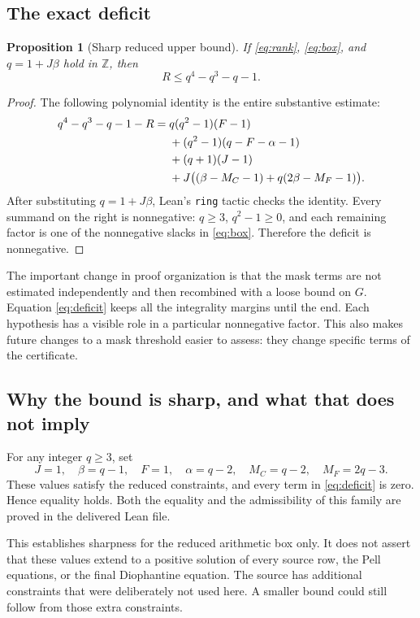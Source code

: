 \documentclass[11pt]{article}
\newtheorem{proposition}{Proposition}
\newcommand{\Z}{\mathbb Z}
\newcommand{\code}[1]{\nolinkurl{#1}}
\begin{document}
\subsection{The exact deficit}

\begin{proposition}[Sharp reduced upper bound]
If \eqref{eq:rank}, \eqref{eq:box}, and $q=1+J\beta$ hold in $\Z$, then
\[
 \boxed{R\le q^4-q^3-q-1.}
\]
\end{proposition}

\begin{proof}
The following polynomial identity is the entire substantive estimate:
\begin{align}
 q^4-q^3-q-1-R
 ={}&q(q^2-1)(F-1)\notag\\
 &+(q^2-1)(q-F-\alpha-1)\notag\\
 &+(q+1)(J-1)\label{eq:deficit}\\
 &+J\bigl((\beta-M_C-1)+q(2\beta-M_F-1)\bigr).\notag
\end{align}
After substituting $q=1+J\beta$, Lean's \code{ring} tactic checks the identity.
Every summand on the right is nonnegative: $q\ge3$, $q^2-1\ge0$, and each
remaining factor is one of the nonnegative slacks in \eqref{eq:box}. Therefore
the deficit is nonnegative.
\end{proof}

The important change in proof organization is that the mask terms are not
estimated independently and then recombined with a loose bound on $G$.
Equation \eqref{eq:deficit} keeps all the integrality margins until the end.
Each hypothesis has a visible role in a particular nonnegative factor. This
also makes future changes to a mask threshold easier to assess: they change
specific terms of the certificate.

\subsection{Why the bound is sharp, and what that does not imply}

For any integer $q\ge3$, set
\[
 J=1,\quad \beta=q-1,\quad F=1,\quad \alpha=q-2,\quad
 M_C=q-2,\quad M_F=2q-3.
\]
These values satisfy the reduced constraints, and every term in
\eqref{eq:deficit} is zero. Hence equality holds. Both the equality and the
admissibility of this family are proved in the delivered Lean file.

This establishes sharpness for the reduced arithmetic box only. It does not
assert that these values extend to a positive solution of every source row,
the Pell equations, or the final Diophantine equation. The source has additional
constraints that were deliberately not used here. A smaller bound could still
follow from those extra constraints.
\end{document}
